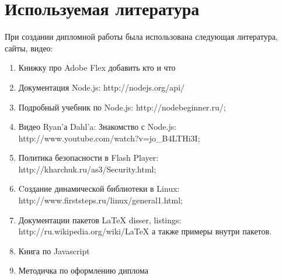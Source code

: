 \chapter{Используемая литература}
При создании дипломной работы была использована следующая литература, сайты, видео:

\begin{enumerate}
  \item  Книжку про Adobe Flex добавить кто и что
  \item  Документация Node.js: http://nodejs.org/api/
  \item Подробный учебник по Node.js: http://nodebeginner.ru/;
  \item Видео Ryan'а Dahl'a: Знакомство с Node.js: \\
http://www.youtube.com/watch?v=jo\_B4LTHi3I;
  \item Политика безопасности в Flash Player:\\ http://kharchuk.ru/as3/Security.html;
  \item Cоздание динамической библиотеки в Linux:\\ http://www.firststeps.ru/linux/general1.html;
  \item Документации пакетов LaTeX disser, listings:\\ http://ru.wikipedia.org/wiki/LaTeX а также примеры внутри пакетов.
  \item Книга по Javascript
  \item Методичка по оформлению диплома
\end{enumerate}
